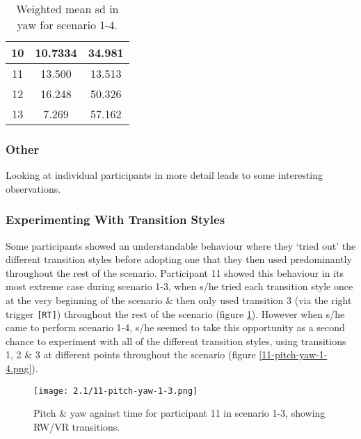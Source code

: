 \begin{table}
\begin{center}
\begin{minipage}[t]{.47\linewidth}
\begin{center}
\begin{tabular}{|c|c|c|}
\hline

10 & 10.7334 & 34.981 \\

\hline

11 & 13.500 & 13.513 \\

\hline

12 & 16.248 & 50.326 \\

\hline

13 & 7.269 & 57.162 \\

\hline
\end{tabular}
\caption{Weighted mean sd in yaw for scenario 1-4.}
\label{mean-sd-yaw-1-4}
\end{center}
\end{minipage}
\end{center}
\end{table}


\subsubsection{Other}

Looking at individual participants in more detail leads to some interesting observations.


\subsubsection{Experimenting With Transition Styles}

Some participants showed an understandable behaviour where they `tried out' the different transition styles before adopting one that they then used predominantly throughout the rest of the scenario. Participant 11 showed this behaviour in its most extreme case during scenario 1-3, when s/he tried each transition style once at the very beginning of the scenario \& then only used transition 3 (via the right trigger \texttt{[RT]}) throughout the rest of the scenario (figure \ref{11-pitch-yaw-1-3.png}). However when s/he came to perform scenario 1-4, s/he seemed to take this opportunity as a second chance to experiment with all of the different transition styles, using transitions 1, 2 \& 3 at different points throughout the scenario (figure \ref{11-pitch-yaw-1-4.png}).

\begin{figure}[h]
	\begin{center}
	\texttt{[image: 2.1/11-pitch-yaw-1-3.png]}
	\caption{Pitch \& yaw against time for participant 11 in scenario 1-3, showing RW/VR transitions.}
	\label{11-pitch-yaw-1-3.png}
	\end{center}
\end{figure}


